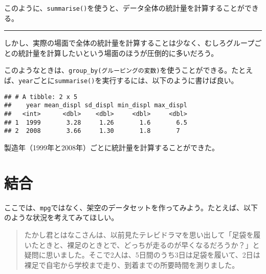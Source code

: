 \documentclass[]{book}
\newenvironment{Shaded}{\begin{snugshade}}{\end{snugshade}}
\newcommand{\KeywordTok}[1]{\textcolor[rgb]{0.13,0.29,0.53}{\textbf{#1}}}
\newcommand{\DataTypeTok}[1]{\textcolor[rgb]{0.13,0.29,0.53}{#1}}
\newcommand{\StringTok}[1]{\textcolor[rgb]{0.31,0.60,0.02}{#1}}
\newcommand{\OperatorTok}[1]{\textcolor[rgb]{0.81,0.36,0.00}{\textbf{#1}}}
\newcommand{\NormalTok}[1]{#1}
\begin{document}
このように、\texttt{summarise()}を使うと、データ全体の統計量を計算することができる。

\begin{center}\rule{0.5\linewidth}{\linethickness}\end{center}

しかし、実際の場面で全体の統計量を計算することは少なく、むしろグループごとの統計量を計算したいという場面のほうが圧倒的に多いだろう。

このようなときは、\texttt{group\_by(グルーピングの変数)}を使うことができる。たとえば、\texttt{year}ごとに\texttt{summarise()}を実行するには、以下のように書けば良い。

\begin{Shaded}
\end{Shaded}

\begin{verbatim}
## # A tibble: 2 x 5
##    year mean_displ sd_displ min_displ max_displ
##   <int>      <dbl>    <dbl>     <dbl>     <dbl>
## 1  1999       3.28     1.26       1.6       6.5
## 2  2008       3.66     1.30       1.8       7
\end{verbatim}

製造年（1999年と2008年）ごとに統計量を計算することができた。

\section{結合}

ここでは、\texttt{mpg}ではなく、架空のデータセットを作ってみよう。たとえば、以下のような状況を考えてみてほしい。

\begin{quote}
たかし君とはなこさんは、以前見たテレビドラマを思い出して「足袋を履いたときと、裸足のときとで、どっちが走るのが早くなるだろうか？」と疑問に思いました。そこで2人は、5日間のうち3日は足袋を履いて、2日は裸足で自宅から学校まで走り、到着までの所要時間を測りました。
\end{quote}
\end{document}
